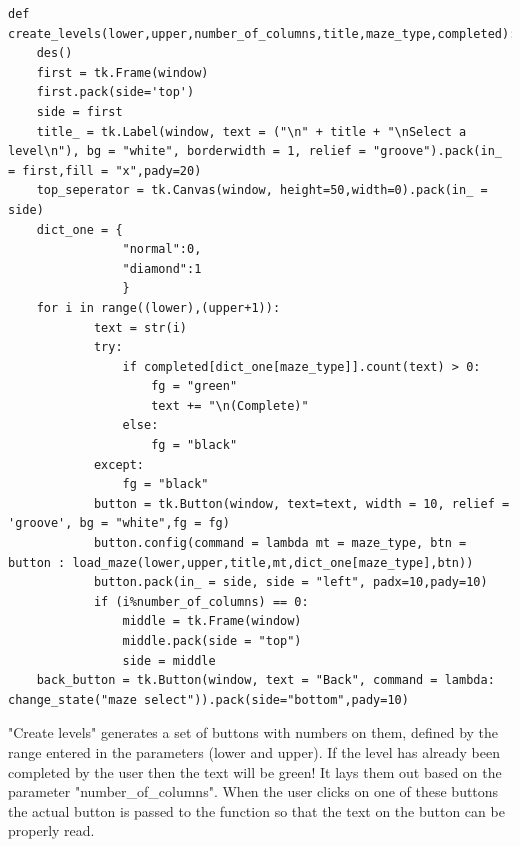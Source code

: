 \begin{lstlisting}
def create_levels(lower,upper,number_of_columns,title,maze_type,completed):
    des()
    first = tk.Frame(window)
    first.pack(side='top')
    side = first
    title_ = tk.Label(window, text = ("\n" + title + "\nSelect a level\n"), bg = "white", borderwidth = 1, relief = "groove").pack(in_ = first,fill = "x",pady=20)
    top_seperator = tk.Canvas(window, height=50,width=0).pack(in_ = side)
    dict_one = {
                "normal":0,
                "diamond":1
                }
    for i in range((lower),(upper+1)):
            text = str(i)                          
            try:
                if completed[dict_one[maze_type]].count(text) > 0:
                    fg = "green"
                    text += "\n(Complete)"
                else:
                    fg = "black"
            except:
                fg = "black"
            button = tk.Button(window, text=text, width = 10, relief = 'groove', bg = "white",fg = fg)
            button.config(command = lambda mt = maze_type, btn = button : load_maze(lower,upper,title,mt,dict_one[maze_type],btn))
            button.pack(in_ = side, side = "left", padx=10,pady=10)
            if (i%number_of_columns) == 0:
                middle = tk.Frame(window)
                middle.pack(side = "top")
                side = middle
    back_button = tk.Button(window, text = "Back", command = lambda: change_state("maze select")).pack(side="bottom",pady=10)

\end{lstlisting}
"Create levels" generates a set of buttons with numbers on them, defined by the range entered in the parameters (lower and upper). If the level has already been completed by the user then the text will be green! It lays them out based on the parameter "number\_of\_columns".
When the user clicks on one of these buttons the actual button is passed to the function so that the text on the button can be properly read.

\clearpage

